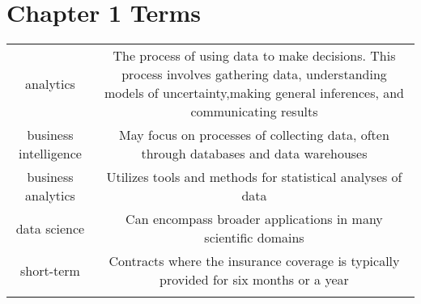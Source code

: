 \documentclass[]{book}
\theoremstyle{definition}
\theoremstyle{definition}
\theoremstyle{definition}
\theoremstyle{remark}
\begin{document}
\section{Chapter 1 Terms}\label{chapter-1-terms}

\begin{longtable}[]{@{}cc@{}}
\toprule
\begin{minipage}[t]{0.41\columnwidth}\centering\strut
analytics\strut
\end{minipage} & \begin{minipage}[t]{0.42\columnwidth}\centering\strut
The process of using data to make decisions. This process involves
gathering data, understanding models of uncertainty,making general
inferences, and communicating results\strut
\end{minipage}\tabularnewline
\begin{minipage}[t]{0.41\columnwidth}\centering\strut
business intelligence\strut
\end{minipage} & \begin{minipage}[t]{0.42\columnwidth}\centering\strut
May focus on processes of collecting data, often through databases and
data warehouses\strut
\end{minipage}\tabularnewline
\begin{minipage}[t]{0.41\columnwidth}\centering\strut
business analytics\strut
\end{minipage} & \begin{minipage}[t]{0.42\columnwidth}\centering\strut
Utilizes tools and methods for statistical analyses of data\strut
\end{minipage}\tabularnewline
\begin{minipage}[t]{0.41\columnwidth}\centering\strut
data science\strut
\end{minipage} & \begin{minipage}[t]{0.42\columnwidth}\centering\strut
Can encompass broader applications in many scientific domains\strut
\end{minipage}\tabularnewline
\begin{minipage}[t]{0.41\columnwidth}\centering\strut
short-term\strut
\end{minipage} & \begin{minipage}[t]{0.42\columnwidth}\centering\strut
Contracts where the insurance coverage is typically provided for six
months or a year\strut
\end{minipage}\tabularnewline
\begin{minipage}[t]{0.41\columnwidth}\centering\strut

\end{minipage}
\end{longtable}
\end{document}
